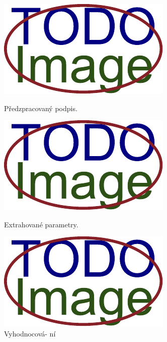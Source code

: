 \begin{figure}[h]
  \centering
  \begin{minipage}{0.3\textwidth}
    \centering
    \includegraphics[width=\textwidth]{obrazky-figures/placeholder.pdf}
    \caption{Předzpracovaný podpis.}
    \label{fig:predzpracovany_podpis}
  \end{minipage}\hfill
  \begin{minipage}{0.3\textwidth}
    \centering
    \includegraphics[width=\textwidth]{obrazky-figures/placeholder.pdf}
    \caption{Extrahované parametry.}
    \label{fig:predzpracovany_podpis}
  \end{minipage}\hfill
  \begin{minipage}{0.3\textwidth}
    \centering
    \includegraphics[width=\textwidth]{obrazky-figures/placeholder.pdf}
    \caption{Vyhodnocová- ní}
    \label{fig:vyhodnocovani}
  \end{minipage}
\end{figure}


